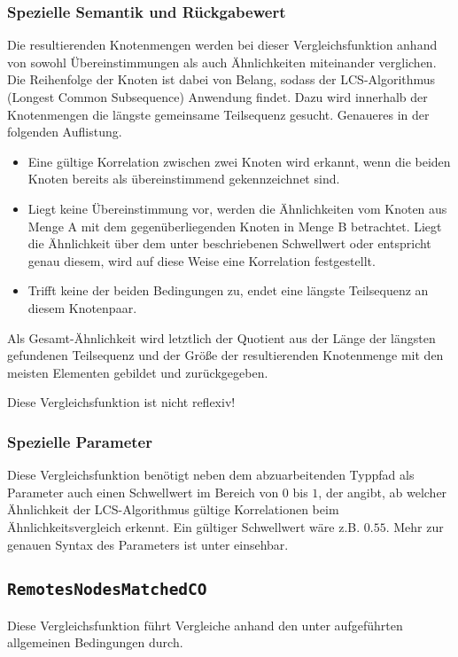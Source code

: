 \subsubsection*{Spezielle Semantik und Rückgabewert}
Die resultierenden Knotenmengen werden bei dieser Vergleichsfunktion anhand von sowohl Übereinstimmungen als auch Ähnlichkeiten miteinander verglichen. Die Reihenfolge der Knoten ist dabei von Belang, sodass der LCS-Algorithmus (Longest Common Subsequence) Anwendung findet. Dazu wird innerhalb der Knotenmengen die längste gemeinsame Teilsequenz gesucht. Genaueres in der folgenden Auflistung.
\begin{itemize}
	\item Eine gültige Korrelation zwischen zwei Knoten wird erkannt, wenn die beiden Knoten bereits als übereinstimmend gekennzeichnet sind.
	\item Liegt keine Übereinstimmung vor, werden die Ähnlichkeiten vom Knoten aus Menge A mit dem gegenüberliegenden Knoten in Menge B betrachtet. Liegt die Ähnlichkeit über dem unter  beschriebenen Schwellwert oder entspricht genau diesem, wird auf diese Weise eine Korrelation festgestellt.
	\item Trifft keine der beiden Bedingungen zu, endet eine längste Teilsequenz an diesem Knotenpaar.
\end{itemize}

Als Gesamt-Ähnlichkeit wird letztlich der Quotient aus der Länge der längsten gefundenen Teilsequenz und der Größe der resultierenden Knotenmenge mit den meisten Elementen gebildet und zurückgegeben.

 Diese Vergleichsfunktion ist nicht reflexiv!

\subsubsection*{Spezielle Parameter}
Diese Vergleichsfunktion benötigt neben dem abzuarbeitenden Typpfad als Parameter auch einen Schwellwert im Bereich von $0$ bis $1$, der angibt, ab welcher Ähnlichkeit der LCS-Algorithmus gültige Korrelationen beim Ähnlichkeitsvergleich erkennt. Ein gültiger Schwellwert wäre z.B. $0.55$. Mehr zur genauen Syntax des Parameters ist unter  einsehbar.


%
%
\subsection{\texttt{RemotesNodesMatchedCO}}
Diese Vergleichsfunktion führt Vergleiche anhand den unter  aufgeführten allgemeinen Bedingungen durch.

